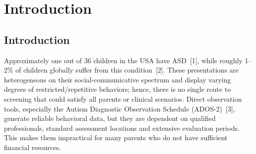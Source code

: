 \documentclass[12pt,a4paper,oneside]{report}
\begin{document}
	\clearpage
	\tableofcontents
	
	\clearpage
	\listoftables
	
	\clearpage
	\listoffigures
	
	\clearpage
	\setcounter{page}{1}
	
	\chapter{Introduction}
	
	\section{Introduction}
	
	Approximately one out of 36 children in the USA have ASD~[1], while roughly 1–2\% of children globally suffer from this condition~[2]. These presentations are heterogeneous on their social-communicative spectrum and display varying degrees of restricted/repetitive behaviors; hence, there is no single route to screening that could satisfy all parents or clinical scenarios. Direct observation tools, especially the Autism Diagnostic Observation Schedule (ADOS-2)~[3], generate reliable behavioral data, but they are dependent on qualified professionals, standard assessment locations and extensive evaluation periods. This makes them impractical for many parents who do not have sufficient financial resources.
	
\end{document}
